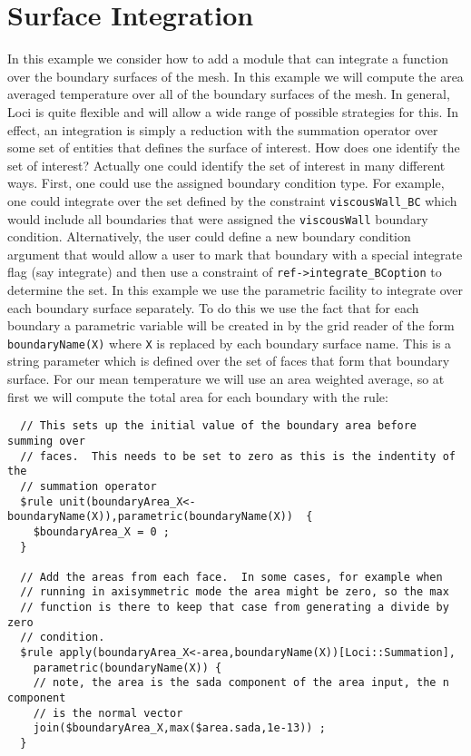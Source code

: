 \documentclass[letterpaper,twoside]{article}
\begin{document}
\section{Surface Integration}
In this example we consider how to add a module that can integrate a
function over the boundary surfaces of the mesh.  In this example we
will compute the area averaged temperature over all of the boundary
surfaces of the mesh.  In general, Loci is quite flexible and will
allow a wide range of possible strategies for this.  In effect, an
integration is simply a reduction with the summation operator over
some set of entities that defines the surface of interest.  How does
one identify the set of interest?  Actually one could identify the set
of interest in many different ways.  First, one could use the assigned
boundary condition type.  For example, one could integrate over the
set defined by the constraint {\tt viscousWall\_BC} which would
include all boundaries that were assigned the {\tt viscousWall}
boundary condition.  Alternatively, the user could define a new
boundary condition argument that would allow a user to mark that
boundary with a special integrate flag (say integrate) and then use a
constraint of {\tt ref->integrate\_BCoption} to determine the set.  In
this example we use the parametric facility to integrate over each
boundary surface separately.  To do this we use the fact that for each
boundary a parametric variable will be created in by the grid reader
of the form {\tt boundaryName(X)} where {\tt X} is replaced by each
boundary surface name.  This is a string parameter which is defined
over the set of faces that form that boundary surface.  For our mean
temperature we will use an area weighted average, so at first we will
compute the total area for each boundary with the rule:
\begin{verbatim}
  // This sets up the initial value of the boundary area before summing over
  // faces.  This needs to be set to zero as this is the indentity of the
  // summation operator
  $rule unit(boundaryArea_X<-boundaryName(X)),parametric(boundaryName(X))  {
    $boundaryArea_X = 0 ;
  }
  
  // Add the areas from each face.  In some cases, for example when
  // running in axisymmetric mode the area might be zero, so the max
  // function is there to keep that case from generating a divide by zero
  // condition.
  $rule apply(boundaryArea_X<-area,boundaryName(X))[Loci::Summation],
    parametric(boundaryName(X)) {
    // note, the area is the sada component of the area input, the n component
    // is the normal vector
    join($boundaryArea_X,max($area.sada,1e-13)) ;
  }
\end{verbatim}
\end{document}
